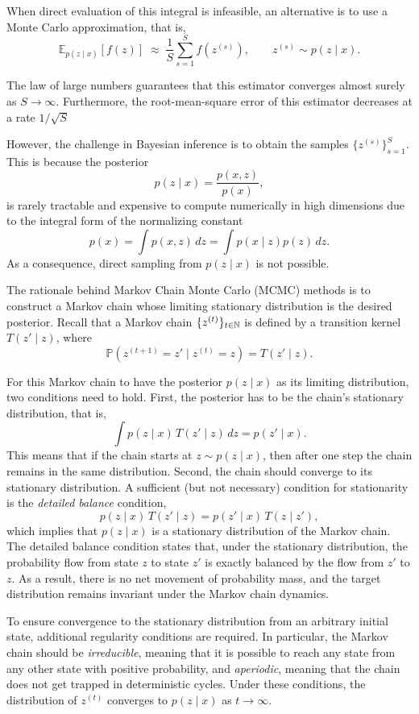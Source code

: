 When direct evaluation of this integral is infeasible, an alternative is to use a Monte Carlo approximation, that is, 
\[
\mathbb E_{p(z\mid x)}[f(z)]
\;\approx\;
\frac{1}{S}\sum_{s=1}^S f(z^{(s)}),
\qquad
z^{(s)} \sim p(z\mid x).
\]

The law of large numbers guarantees that this estimator converges almost surely as \(S \to \infty\). Furthermore, the root-mean-square error of this estimator decreases at a rate $1/\sqrt{S}$

However, the challenge in Bayesian inference is to obtain the samples $\{z^{(s)}\}_{s=1}^S$. This is because the posterior
\[
p(z\mid x) = \frac{p(x,z)}{p(x)},
\]
is rarely tractable and expensive to compute numerically in high dimensions due to the integral form of the normalizing constant  
\[
p(x) = \int p(x,z)\,dz = \int p(x \mid z)p(z)\,dz.
\]
As a consequence, direct sampling from \(p(z\mid x)\) is not possible.

The rationale behind Markov Chain Monte Carlo (MCMC) methods is to construct a Markov chain whose limiting stationary distribution is the desired posterior. Recall that a Markov chain \(\{z^{(t)}\}_{t \in {\mathbb N}}\) is defined by a transition kernel $T(z' \mid z)$,
where
\[
\mathbb P(z^{(t+1)} = z' \mid z^{(t)} = z) = T(z' \mid z).
\]

For this Markov chain to have the posterior $p(z \mid x)$ as its limiting distribution, two conditions need to hold. First, the posterior has to be the chain's stationary distribution, that is, 
\[
\int p(z\mid x)\,T(z' \mid z)\,dz = p(z'\mid x).
\]
This means that if the chain starts at $z \sim p(z \mid x)$, then after one step the chain remains in the same distribution. Second, the chain should converge to its stationary distribution.  A sufficient (but not necessary) condition for stationarity is the
\emph{detailed balance} condition,
\begin{equation}
    p(z\mid x)\,T(z' \mid z)
=
p(z'\mid x)\,T(z \mid z'),
\label{eq:detailed_balance}    
\end{equation}
which implies that \(p(z\mid x)\) is a stationary distribution of the Markov
chain. The detailed balance condition states that, under the stationary distribution, the probability flow from state \(z\) to state \(z'\) is exactly balanced by the flow from \(z'\) to \(z\). As a result, there is no net movement of probability mass, and the target distribution remains invariant under the Markov chain dynamics.

To ensure convergence to the stationary distribution from an arbitrary initial
state, additional regularity conditions are required. In particular, the Markov
chain should be \emph{irreducible}, meaning that it is possible to reach any
state from any other state with positive probability, and \emph{aperiodic},
meaning that the chain does not get trapped in deterministic cycles. Under these conditions, the distribution of \(z^{(t)}\) converges to
\(p(z\mid x)\) as \(t \to \infty\).


